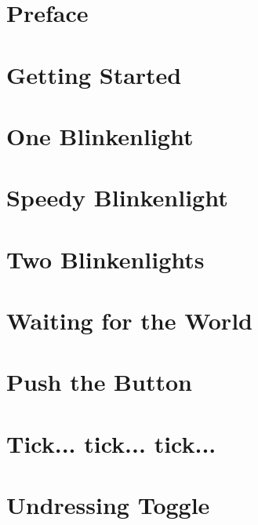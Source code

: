 \documentclass[a5paper,oneside]{scrbook}
\begin{document}
	



\tableofcontents

\chapter*{Preface\label{preface}}


\chapter{Getting Started\label{ch0}}


\chapter{One Blinkenlight\label{ch1}}


\chapter{Speedy Blinkenlight\label{ch2}}


\chapter{Two Blinkenlights\label{ch3}}


\chapter*{Waiting for the World\label{medio1}}


\chapter{Push the Button\label{ch4}}


\chapter{Tick... tick... tick...\label{ch5a}}


\chapter{Undressing Toggle\label{ch5}}

\end{document}
